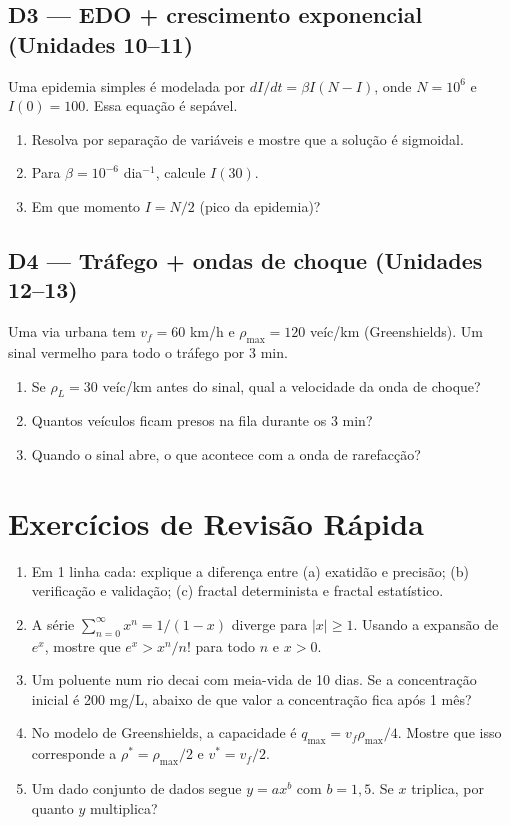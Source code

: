 \documentclass[12pt,a4paper]{article}
\begin{document}
\subsection*{D3 --- EDO + crescimento exponencial (Unidades 10--11)}
Uma epidemia simples \'e modelada por $dI/dt = \beta I(N-I)$, onde $N=10^6$ e $I(0)=100$. Essa equa\c{c}\~ao \'e sep\'avel.
\begin{enumerate}
  \item[$a.$] Resolva por separa\c{c}\~ao de vari\'aveis e mostre que a solu\c{c}\~ao \'e sigmoidal.
  \item[$b.$] Para $\beta = 10^{-6}$ dia$^{-1}$, calcule $I(30)$.
  \item[$c.$] Em que momento $I = N/2$ (pico da epidemia)?
\end{enumerate}

\subsection*{D4 --- Tr\'afego + ondas de choque (Unidades 12--13)}
Uma via urbana tem $v_f=60$ km/h e $\rho_\text{max}=120$ ve\'ic/km (Greenshields). Um sinal vermelho para todo o tr\'afego por 3 min.
\begin{enumerate}
  \item[$a.$] Se $\rho_L = 30$ ve\'ic/km antes do sinal, qual a velocidade da onda de choque?
  \item[$b.$] Quantos ve\'iculos ficam presos na fila durante os 3 min?
  \item[$c.$] Quando o sinal abre, o que acontece com a onda de rarefac\c{c}\~ao?
\end{enumerate}

\section*{Exerc\'icios de Revis\~ao R\'apida}

\begin{enumerate}
  \item Em 1 linha cada: explique a diferen\c{c}a entre (a) exatid\~ao e precis\~ao; (b) verifica\c{c}\~ao e valida\c{c}\~ao; (c) fractal determinista e fractal estat\'istico.
  
  \item A s\'erie $\sum_{n=0}^\infty x^n = 1/(1-x)$ diverge para $|x|\ge1$. Usando a expans\~ao de $e^x$, mostre que $e^x > x^n/n!$ para todo $n$ e $x > 0$.
  
  \item Um poluente num rio decai com meia-vida de 10 dias. Se a concentra\c{c}\~ao inicial \'e 200 mg/L, abaixo de que valor a concentra\c{c}\~ao fica ap\'os 1 m\^es?
  
  \item No modelo de Greenshields, a capacidade \'e $q_\text{max} = v_f\rho_\text{max}/4$. Mostre que isso corresponde a $\rho^* = \rho_\text{max}/2$ e $v^* = v_f/2$.
  
  \item Um dado conjunto de dados segue $y = ax^b$ com $b = 1{,}5$. Se $x$ triplica, por quanto $y$ multiplica?
\end{enumerate}
\end{document}
